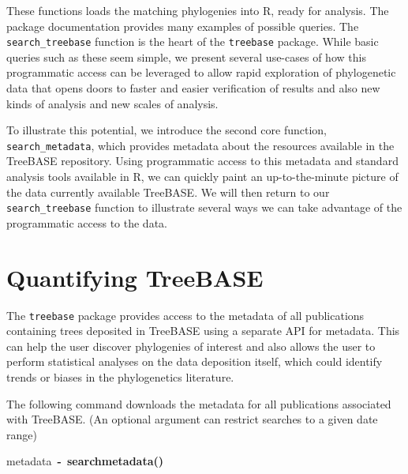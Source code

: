 \documentclass[authoryear, preprint]{elsarticle}
\makeatletter
\newcommand{\hlfunctioncall}[1]{\textcolor[rgb]{.5,0,.33}{\textbf{#1}}}%
\newcommand{\hlkeyword}[1]{\textbf{#1}}%
\newcommand{\hlassignement}[1]{\textbf{#1}}%
\newcommand{\hlsymbol}[1]{#1}%
\newenvironment{kframe}{%
 \def\FrameCommand##1{\hskip\@totalleftmargin \hskip-\fboxsep
 \colorbox{shadecolor}{##1}\hskip-\fboxsep
     \hskip-\linewidth \hskip-\@totalleftmargin \hskip\columnwidth}%
 \MakeFramed {\advance\hsize-\width
   \@totalleftmargin\z@ \linewidth\hsize
   \@setminipage}}%
 {\par\unskip\endMakeFramed}
\newenvironment{knitrout}{}{} %
\makeatother
\begin{document}
These functions loads the matching phylogenies into R, ready for analysis.  
The package documentation provides many examples of possible queries. 
The \verb|search_treebase| function is the heart of the \texttt{treebase} package.  
While basic queries such as these seem simple,
we present several use-cases of how this programmatic access can be leveraged to allow rapid exploration of phylogenetic data
that opens doors to faster and easier verification of results and also new kinds of analysis and new scales of analysis. 

To illustrate this potential, we introduce the second core function, \verb|search_metadata|, which provides metadata about the resources available in the TreeBASE repository.  Using programmatic access to this metadata and standard analysis tools available in R, we can quickly paint an up-to-the-minute picture of the data currently available TreeBASE.  We will then return to our \verb|search_treebase| function to illustrate several ways we can take advantage of the programmatic access to the data.  

\section{Quantifying TreeBASE}
The \texttt{treebase} package provides access to the metadata
of all publications containing trees
deposited in TreeBASE using a separate API for metadata.  
This can help the user discover phylogenies of interest
and also allows the user to perform statistical analyses
on the data deposition itself, which could identify trends or biases in the phylogenetics literature.  


  
The following command downloads the metadata for all publications associated with TreeBASE.  (An optional argument can restrict searches to a given date range)
\begin{knitrout}
\color{fgcolor}\begin{kframe}
\begin{flushleft}
\ttfamily\noindent
\hlsymbol{metadata}{\ }\hlassignement{\usebox{\hlnormalsizeboxlessthan}-}{\ }\hlfunctioncall{search\usebox{\hlnormalsizeboxunderscore}metadata}\hlkeyword{(}\hlkeyword{)}\mbox{}
\normalfont
\end{flushleft}
\end{kframe}
\end{knitrout}
\end{document}
